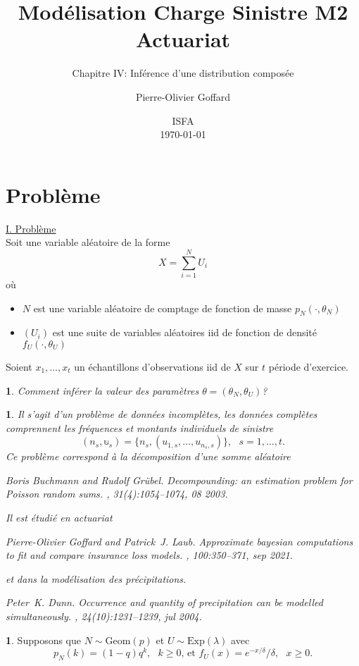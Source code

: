 \documentclass[8pt,notheorems]{beamer}
\title[]{Modélisation Charge Sinistre M2 Actuariat}
\subtitle{Chapitre IV: Inférence d'une distribution composée}
\author{Pierre-Olivier Goffard}
\institute{
	   Université de Lyon 1\\
	ISFA\\
	   \texttt{pierre-olivier.goffard@univ-lyon1.fr}
	  }
\date{
ISFA\\
\today}
\newtheorem{problem}{\translate{Problem}}
\newtheorem{remark}{\translate{Remark}}
\theoremstyle{definition}
\theoremstyle{example}
\newtheorem{example}{\translate{Example}}
\theoremstyle{mystyle}
\theoremstyle{plain}
\begin{document}
\frame{\titlepage}


\section{Problème}
\begin{frame}[allowframebreaks]
\underline{I. Problème}\\ 
Soit une variable aléatoire de la forme 
$$
X =\sum_{i=1}^N U_i
$$
où
\begin{itemize}
    \item $N$ est une variable aléatoire de comptage de fonction de masse $p_N(\cdot,\theta_{N})$
    \item $(U_i)$ est une suite de variables aléatoires iid de fonction de densité $f_U(\cdot,\theta_{U})$
\end{itemize}
Soient $x_1,\ldots, x_t$ un échantillons d'observations iid de $X$ sur $t$ période d'exercice.
\begin{problem}
 Comment inférer la valeur des paramètres $\theta = (\theta_{N},\theta_U)$? 
\end{problem}
\begin{remark}
Il s'agit d'un problème de données incomplètes, les données complètes comprennent les fréquences et montants individuels de sinistre
$$
(n_s,\mathbb{u}_s) = \{n_s,(u_{1,s},\ldots, u_{n_s,s})\},\text{ }s = 1,\ldots, t.
$$
Ce problème correspond à la décomposition d'une somme aléatoire \tiny
\begin{thebibliography}{1}

Boris Buchmann and Rudolf Grübel.
\newblock Decompounding: an estimation problem for {P}oisson random sums.
, 31(4):1054--1074, 08 2003.
\end{thebibliography} 
\normalsize
Il est étudié en actuariat 
\tiny
\begin{thebibliography}{1}
Pierre-Olivier Goffard and Patrick~J. Laub.
\newblock Approximate bayesian computations to fit and compare insurance loss
  models.
, 100:350--371, sep 2021.
\end{thebibliography} 
\normalsize 
 et dans la modélisation des précipitations.\tiny
\begin{thebibliography}{1}
Peter~K. Dunn.
\newblock Occurrence and quantity of precipitation can be modelled
  simultaneously.
, 24(10):1231--1239, jul
  2004.
\end{thebibliography} 

\end{remark}
\begin{example}
Supposons que $N\sim\text{Geom}(p)$ et $U\sim\text{Exp}(\lambda)$ avec 
$$
p_{N}(k) = (1-q)q^k,\text{ }k\geq0\text{, et }f_U(x) =  e^{- x/\delta}/\delta,\text{ }x\geq0.
$$
\end{example}

\end{frame}
\end{document}
